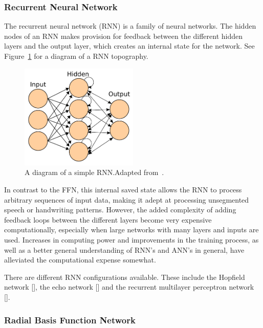 \subsubsection{Recurrent Neural Network}

The recurrent neural network (RNN) is a family of neural networks. The hidden nodes of an RNN makes provision for feedback between the different hidden layers and the output layer, which creates an internal state for the network. See Figure~\ref{fig:chap2-rnn-diagram} for a diagram of a RNN topography.

\begin{figure}
 \centering
 \includegraphics[width=0.5\textwidth]{figures/chapter2/rnn_diagram}
 \caption[A diagram of a simple RNN.]{A diagram of a simple RNN.\@ Adapted from~\cite{ann-wiki-pic}.}
\label{fig:chap2-rnn-diagram}
\end{figure}

In contrast to the FFN, this internal saved state allows the RNN to process arbitrary sequences of input data, making it adept at processing unsegmented speech or handwriting patterns. However, the added complexity of adding feedback loops between the different layers become very expensive computationally, especially when large networks with many layers and inputs are used. Increases in computing power and improvements in the training process, as well as a better general understanding of RNN's and ANN's in general, have alleviated the computational expense somewhat.

There are different RNN configurations available. These include the Hopfield network [\cite{hopfield1982neural}], the echo network [\cite{jaeger2001echo}] and the recurrent multilayer perceptron network [\cite{tutschku1995recurrent}].

\subsubsection{Radial Basis Function Network}

